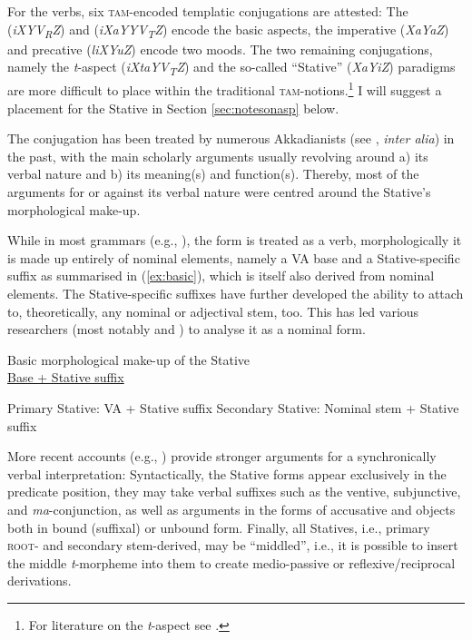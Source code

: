 \documentclass[output=paper,colorlinks,citecolor=brown]{langscibook}
\begin{document}
For the verbs, six \textsc{tam}-encoded templatic conjugations are attested: The  (\textit{iXYV\textsubscript{R}Z}) and  (\textit{iXaYYV\textsubscript{T}Z}) encode the basic aspects, the imperative (\textit{XaYaZ}) and precative (\textit{liXYuZ}) encode two moods. The two remaining conjugations, namely the \textit{t}-aspect (\textit{iXtaYV\textsubscript{T}Z}) and the so-called “Stative” (\textit{XaYiZ}) paradigms are more difficult to place within the traditional \textsc{tam}-notions.\footnote{For literature on the \textit{t}-aspect see \citet{streck_zahl_1995,streck_akkadischen_2003,hackl_subordinierte_2007,brose_perfekt_2019}.} I will suggest a placement for the Stative in Section \ref{sec:notesonasp} below.

The conjugation has been treated by numerous Akkadianists (see \cite{buccellati_interpretation_1968,buccellati_state_1988,kraus_nominalsatze_1984,huehnergard_stative_1987,kouwenberg_nouns_2000,carver_akkadian_2016,kamil2023stative}, \textit{inter alia}) in the past, with the main scholarly arguments usually revolving around a) its verbal nature and b) its meaning(s) and function(s). Thereby, most of the arguments for or against its verbal nature were centred around the Stative's morphological make-up.

While in most grammars (e.g., \cite{reiner_linguistic_1966,von_soden_grundriss_1995}), the form is treated as a verb, morphologically it is made up entirely of nominal elements, namely a VA base and a Stative-specific suffix as summarised in (\ref{ex:basic}), which is itself also derived from nominal elements. The Stative-specific suffixes have further developed the ability to attach to, theoretically, any nominal or adjectival stem, too. This has led various researchers (most notably \cite{huehnergard_stative_1987} and \cite{buccellati_state_1988}) to analyse it as a nominal form. 

\begin{exe}
\ex Basic morphological make-up of the Stative \label{ex:basic}\\
\underline{Base + Stative suffix}
\begin{xlist}
    \ex Primary  Stative: VA + Stative suffix
\ex Secondary Stative: Nominal stem + Stative suffix
\end{xlist}
\end{exe}

 More recent accounts (e.g., \cite{kouwenberg_nouns_2000,carver_akkadian_2016,kamil2023stative}) provide stronger arguments for a synchronically verbal interpretation: Syntactically, the Stative forms appear exclusively in the predicate position, they may take verbal suffixes such as the ventive, subjunctive, and \textit{ma}-conjunction, as well as arguments in the forms of accusative and  objects both in bound (suffixal) or unbound form. Finally, all Statives, i.e., primary  \textsc{root}- and secondary stem-derived, may be “middled”, i.e., it is possible to insert the middle \textit{t}-morpheme  into them to create medio-passive or reflexive/reciprocal derivations. 
\end{document}
